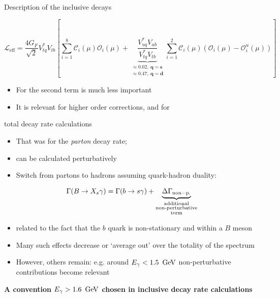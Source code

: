 \documentclass[xcolor=dvipsnames]{beamer}
\begin{document}
\begin{frame}{Description of the inclusive decays}
   \scriptsize

   \begin{equation}\nonumber
      \mathcal{L}_{\mathrm{eff}} = \frac{4G_F}{\sqrt{2}}V_{tq}^*V_{tb}\left[\sum^{8}_{i=1}\mathcal{C}_i(\mu)\mathcal{O}_i(\mu)
                                                  + {\underbrace{\frac{V^*_{uq}V_{ub}}{V^*_{tq}V_{tb}}}_{\substack{\approx 0.02,~\mathbf{q = s}\\\approx 0.47,~\mathbf{q = d}}}}\sum^{2}_{i=1}\mathcal{C}_i(\mu)(\mathcal{O}_i(\mu)-\mathcal{O}_i^u(\mu))\right]
   \end{equation}

\begin{itemize}
   \item For \btosgamma the second term is much less important
   \item It is relevant for higher order corrections, and for \btodgamma
\end{itemize}

\end{frame}


\begin{frame}{\safeBtoXsgamma total decay rate calculations}
\scriptsize
   \begin{itemize}
      \item That was for the \textit{parton} decay rate;
      \item[\ra] can be calculated perturbatively 
      \item Switch from partons to hadrons assuming quark-hadron duality:
   \end{itemize}

   \vspace{10pt}

   \begin{equation}\nonumber
      \Gamma(B\rightarrow X_s\gamma) = \Gamma(b\rightarrow s\gamma) + \underbrace{\Delta\Gamma_{\mathrm{non-p.}}}_{\substack{\text{additional}\\\text{non-perturbative}\\\text{term}}}
  \end{equation}
  \begin{itemize}
   \item[\ra] related to the fact that the $b$ quark is non-stationary and within a $B$ meson
   \item Many such effects decrease or `average out' over the totality of the spectrum
   \item However, others remain: e.g. around ${E_{\gamma}}<1.5~\mathrm{\,Ge\kern -0.1em V}$ non-perturbative \ccbar contributions become relevant 
     \end{itemize}

     \textbf{A convention ${E_{\gamma}}>1.6~\mathrm{\,Ge\kern -0.1em V}$ chosen in inclusive decay rate calculations}

\end{frame}
\end{document}
